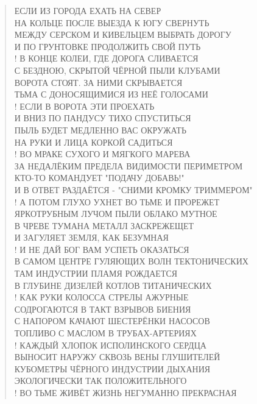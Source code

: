\poemtitle{***}
\begin{verse}
ЕСЛИ ИЗ ГОРОДА ЕХАТЬ НА СЕВЕР\\
НА КОЛЬЦЕ ПОСЛЕ ВЫЕЗДА К ЮГУ СВЕРНУТЬ\\
МЕЖДУ СЕРСКОМ И КИВЕЛЬЦЕМ ВЫБРАТЬ ДОРОГУ\\
И ПО ГРУНТОВКЕ ПРОДОЛЖИТЬ СВОЙ ПУТЬ\\!
В КОНЦЕ КОЛЕИ, ГДЕ ДОРОГА СЛИВАЕТСЯ\\
С БЕЗДНОЮ, СКРЫТОЙ ЧЁРНОЙ ПЫЛИ КЛУБАМИ\\
ВОРОТА СТОЯТ. ЗА НИМИ СКРЫВАЕТСЯ\\
ТЬМА С ДОНОСЯЩИМИСЯ ИЗ НЕЁ ГОЛОСАМИ\\!
ЕСЛИ В ВОРОТА ЭТИ ПРОЕХАТЬ\\
И ВНИЗ ПО ПАНДУСУ ТИХО СПУСТИТЬСЯ\\
ПЫЛЬ БУДЕТ МЕДЛЕННО ВАС ОКРУЖАТЬ\\
НА РУКИ И ЛИЦА КОРКОЙ САДИТЬСЯ\\!
ВО МРАКЕ СУХОГО И МЯГКОГО МАРЕВА\\
ЗА НЕДАЛЁКИМ ПРЕДЕЛА ВИДИМОСТИ ПЕРИМЕТРОМ\\
КТО-ТО КОМАНДУЕТ "ПОДАЧУ ДОБАВЬ!"\\
И В ОТВЕТ РАЗДАЁТСЯ - "СНИМИ КРОМКУ ТРИММЕРОМ"\\!
А ПОТОМ ГЛУХО УХНЕТ ВО ТЬМЕ И ПРОРЕЖЕТ\\
ЯРКОТРУБНЫМ ЛУЧОМ ПЫЛИ ОБЛАКО МУТНОЕ\\
В ЧРЕВЕ ТУМАНА МЕТАЛЛ ЗАСКРЕЖЕЩЕТ\\
И ЗАГУЛЯЕТ ЗЕМЛЯ, КАК БЕЗУМНАЯ\\!
И  НЕ ДАЙ БОГ ВАМ УСПЕТЬ ОКАЗАТЬСЯ\\
В САМОМ ЦЕНТРЕ ГУЛЯЮЩИХ ВОЛН ТЕКТОНИЧЕСКИХ\\
ТАМ ИНДУСТРИИ ПЛАМЯ РОЖДАЕТСЯ\\
В ГЛУБИНЕ ДИЗЕЛЕЙ КОТЛОВ ТИТАНИЧЕСКИХ\\!
КАК РУКИ КОЛОССА СТРЕЛЫ АЖУРНЫЕ\\
СОДРОГАЮТСЯ В ТАКТ ВЗРЫВОВ БИЕНИЯ\\
С НАПОРОМ КАЧАЮТ ШЕСТЕРЁНКИ НАСОСОВ \\
ТОПЛИВО С МАСЛОМ В ТРУБАХ-АРТЕРИЯХ\\!
КАЖДЫЙ ХЛОПОК ИСПОЛИНСКОГО СЕРДЦА\\
ВЫНОСИТ НАРУЖУ СКВОЗЬ ВЕНЫ ГЛУШИТЕЛЕЙ \\
КУБОМЕТРЫ ЧЁРНОГО ИНДУСТРИИ ДЫХАНИЯ\\
ЭКОЛОГИЧЕСКИ ТАК ПОЛОЖИТЕЛЬНОГО\\!
ВО ТЬМЕ ЖИВЁТ ЖИЗНЬ НЕГУМАННО ПРЕКРАСНАЯ\\

\end{verse}
